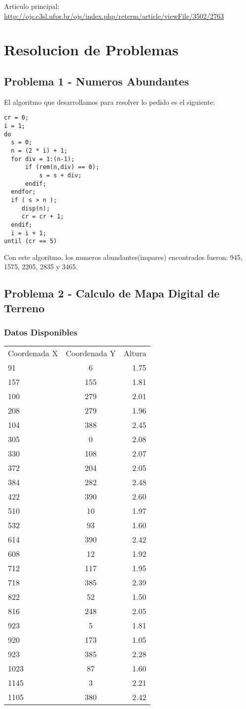\documentclass{article}
\begin{document}
Articulo principal:
\url{http://ojs.c3sl.ufpr.br/ojs/index.php/reterm/article/viewFile/3502/2763}

\section{Resolucion de Problemas}

\subsection{Problema 1 - Numeros Abundantes}
El algoritmo que desarrollamos para resolver lo pedido es el siguiente:
\begin{verbatim}
cr = 0;
i = 1;
do
  s = 0;
  n = (2 * i) + 1;
  for div = 1:(n-1);
      if (rem(n,div) == 0);
          s = s + div;
      endif;
  endfor;
  if ( s > n );
     disp(n);
     cr = cr + 1;
  endif;
  i = i + 1;
until (cr == 5)
\end{verbatim}
Con este algoritmo, los numeros abundantes(impares) encontrados
fueron: 945, 1575, 2205, 2835 y 3465.

\subsection{Problema 2 - Calculo de Mapa Digital de Terreno}
\subsubsection{Datos Disponibles}
\begin{tabular}{l c r}
Coordenada X &Coordenada Y &Altura\\
91	&6	&1.75 \\
157	&155	&1.81\\
100	&279	&2.01\\
208	&279	&1.96\\
104	&388	&2.45\\
305	&0	&2.08\\
330	&108	&2.07\\
372	&204	&2.05\\
384	&282	&2.48\\
422	&390	&2.60\\
510	&10	&1.97\\
532	&93	&1.60\\
614	&390	&2.42\\
608	&12	&1.92\\
712	&117	&1.95\\
718	&385	&2.39\\
822	&52	&1.50\\
816	&248	&2.05\\
923	&5	&1.81\\
920	&173	&1.05\\
923	&385	&2.28\\
1023	&87	&1.60\\
1145	&3	&2.21\\
1105	&380	&2.42\\
\end{tabular}
\end{document}
